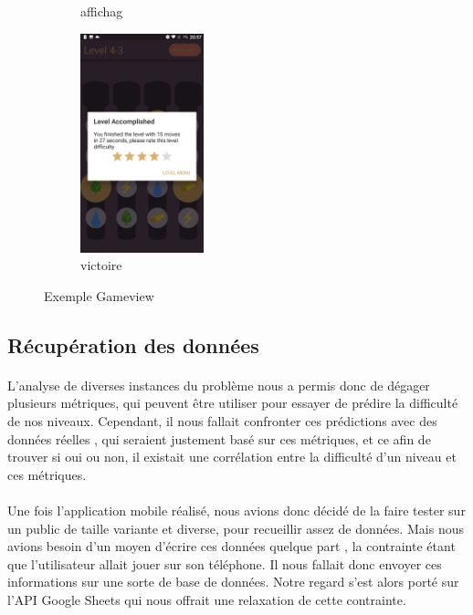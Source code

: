 \documentclass[a4paper, 10pt]{article}
\begin{document}
\begin{figure}[h!]
\begin{subfigure}[c]{0.23\textwidth}
        \caption{affichag}
    \end{subfigure}%
    \begin{subfigure}[d]{0.23\textwidth}
        \centering
        \includegraphics[height=2.5in]{g4}
        \caption{victoire}
    \end{subfigure}
    \caption{Exemple Gameview}
\end{figure}

	\subsection{Récupération des données}
	
	\paragraph{}
	L’analyse de diverses instances du problème nous a permis donc de dégager plusieurs métriques, qui peuvent être utiliser pour essayer de prédire la difficulté de nos niveaux. Cependant, il nous fallait confronter ces prédictions avec des données réelles , qui seraient justement basé sur ces métriques, et ce afin de trouver si oui ou non, il existait une corrélation entre la difficulté d’un niveau et ces métriques. 
	\paragraph{}
Une fois l’application mobile réalisé, nous avions donc décidé de la faire tester sur un public de taille variante et diverse, pour recueillir assez de données. Mais nous avions besoin d’un moyen d’écrire ces données quelque part , la contrainte étant que l’utilisateur allait jouer sur son téléphone. Il nous fallait donc envoyer ces informations sur une sorte de base de données. Notre regard s’est alors porté sur l’API Google Sheets qui nous offrait une relaxation de cette contrainte.
\end{document}
